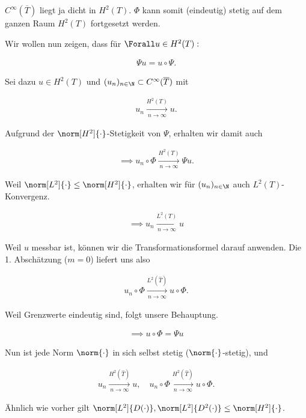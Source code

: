 \begin{solution}
$C^{\infty}(\overline{T})$ liegt ja dicht in $H^2(T)$.
$\Phi$ kann somit (eindeutig) stetig auf dem ganzen Raum $H^2(T)$ fortgesetzt werden.

Wir wollen nun zeigen, dass für $\Forall u \in H^2(T):$

\begin{align*}
  \Psi u = u \circ \Psi.
\end{align*}

Sei dazu $u \in H^2(T)$ und $(u_n)_{n \in \N} \subset C^{\infty}(\overline{T})$ mit

\begin{align*}
  u_n \xrightarrow[n \to \infty]{H^2(T)} u.
\end{align*}

Aufgrund der $\norm[H^2]{\cdot}$-Stetigkeit von $\Psi$, erhalten wir damit auch

\begin{align*}
  \implies
  u_n \circ \Phi \xrightarrow[n \to \infty]{H^2(T)} \Psi u.
\end{align*}

Weil $\norm[L^2]{\cdot} \leq \norm[H^2]{\cdot}$, erhalten wir für $(u_n)_{n \in \N}$ auch $L^2(T)$-Konvergenz.

\begin{align*}
  \implies
  u_n \xrightarrow[n \to \infty]{L^2(T)} u
\end{align*}

Weil $u$ messbar ist, können wir die Transformationsformel darauf anwenden.
Die 1. Abschätzung ($m = 0$) liefert uns also

\begin{align*}
  u_n \circ \Phi \xrightarrow[n \to \infty]{L^2(\hat T)} u \circ \Phi.
\end{align*}

Weil Grenzwerte eindeutig sind, folgt unsere Behauptung.

\begin{align*}
  \implies
  u \circ \Phi = \Psi u
\end{align*}

Nun ist jede Norm $\norm{\cdot}$ in sich selbst stetig ($\norm{\cdot}$-stetig), und

\begin{align*}
  u_n \xrightarrow[n \to \infty]{H^2(\hat T)} u,
  \quad
  u_n \circ \Phi \xrightarrow[n \to \infty]{H^2(\hat T)} u \circ \Phi.
\end{align*}

Ähnlich wie vorher gilt $\norm[L^2]{D (\cdot)}, \norm[L^2]{D^2 (\cdot)} \leq \norm[H^2]{\cdot}$.


\end{solution}
